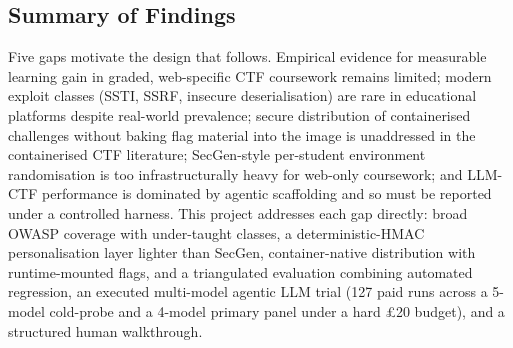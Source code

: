 \subsection{Summary of Findings}
Five gaps motivate the design that follows. Empirical evidence
for measurable learning gain in graded, web-specific CTF
coursework remains limited; modern exploit classes (SSTI, SSRF,
insecure deserialisation) are rare in educational platforms
despite real-world prevalence; secure distribution of
containerised challenges without baking flag material into the
image is unaddressed in the containerised CTF literature;
SecGen-style per-student environment randomisation is too
infrastructurally heavy for web-only coursework; and LLM-CTF
performance is dominated by agentic scaffolding and so must be
reported under a controlled harness. This project addresses
each gap directly: broad OWASP coverage with under-taught
classes, a deterministic-HMAC personalisation layer lighter
than SecGen, container-native distribution with runtime-mounted
flags, and a triangulated evaluation combining automated
regression, an executed multi-model agentic LLM trial (127 paid
runs across a 5-model cold-probe and a 4-model primary panel
under a hard \pounds20 budget), and a structured human
walkthrough.

